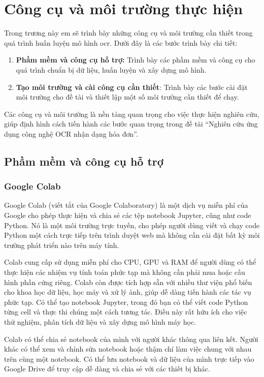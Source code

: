 \chapter{Công cụ và môi trường thực hiện}
Trong trương này em sẽ trình bày những công cụ và môi trường cần thiết trong quá trình huấn luyện mô hình \acrshort*{ocr}. Dưới đây là các bước trình bày chi tiết:
\begin{enumerate}
    \item \textbf{Phầm mềm và công cụ hỗ trợ:} Trình bày các phầm mềm và công cụ cho quá trình chuẩn bị dữ liệu, huấn luyện và xây dựng mô hình.
    \item \textbf{Tạo môi trường và cài công cụ cần thiết}: Trình bày các bước cài đặt môi trường cho đề tài và thiết lập một số môi trường cần thiết để chạy.

\end{enumerate}

Các công cụ và môi trường là nền tảng quan trọng cho việc thực hiện nghiên cứu, giúp định hình cách tiến hành các bước quan trọng trong đề tài ``Nghiên cứu ứng dụng công nghệ OCR nhận dạng hóa đơn''.

\section{Phầm mềm và công cụ hỗ trợ}
\subsection{Google Colab}
Google Colab (viết tắt của Google Colaboratory) là một dịch vụ miễn phí của Google cho phép thực hiện và chia sẻ các tệp notebook Jupyter, cũng như code Python. Nó là một môi trường trực tuyến, cho phép người dùng viết và chạy code Python một cách trực tiếp trên trình duyệt web mà không cần cài đặt bất kỳ môi trường phát triển nào trên máy tính.

Colab cung cấp sử dụng miễn phí cho CPU, GPU và RAM để người dùng có thể thực hiện các nhiệm vụ tính toán phức tạp mà không cần phải mua hoặc cấu hình phần cứng riêng. Colab còn được tích hợp sẵn với nhiều thư viện phổ biến cho khoa học dữ liệu, học máy và xử lý ảnh, giúp dễ dàng tiến hành các tác vụ phức tạp. Có thể tạo notebook Jupyter, trong đó bạn có thể viết code Python từng cell và thực thi chúng một cách tương tác. Điều này rất hữu ích cho việc thử nghiệm, phân tích dữ liệu và xây dựng mô hình máy học.

Colab có thể chia sẻ notebook của mình với người khác thông qua liên kết. Người khác có thể xem và chỉnh sửa notebook hoặc thậm chí làm việc chung với nhau trên cùng một notebook. Có thể lưu notebook và dữ liệu của mình trực tiếp vào Google Drive để truy cập dễ dàng và chia sẻ với các thiết bị khác.

